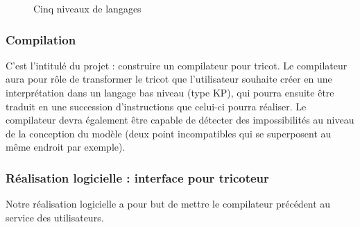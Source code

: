 \documentclass{article}
\begin{document}
    \begin{figure}[!h]
    \centering


    \caption{Cinq niveaux de langages}
    \label{nvx-lg}
    \end{figure}

    
\subsubsection{Compilation}

C'est l'intitulé du projet : construire un compilateur pour tricot. Le compilateur aura pour rôle de transformer le tricot que
l'utilisateur souhaite créer en une interprétation dans un langage bas niveau (type KP), qui pourra ensuite être traduit en une succession
d'instructions que celui-ci pourra réaliser.
Le compilateur devra également être capable de détecter des impossibilités au niveau de la conception du modèle (deux point incompatibles qui se superposent au même endroit par exemple).


\subsubsection{Réalisation logicielle : interface pour tricoteur}

Notre réalisation logicielle a pour but de mettre le compilateur précédent au service des utilisateurs.
\end{document}
